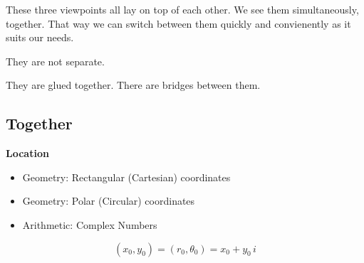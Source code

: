 \documentclass{ximera}
\begin{document}
These three viewpoints all lay on top of each other.  We see them simultaneously, together.  That way we can switch between them quickly and convienently as it suits our needs. 

They are not separate. 

They are glued together.  There are bridges between them.































\qquad




\subsection*{Together}



\textbf{\textcolor{purple!85!blue}{Location}} 


\begin{itemize}
\item Geometry: Rectangular (Cartesian) coordinates
\item Geometry: Polar (Circular) coordinates
\item Arithmetic: Complex Numbers
\end{itemize}



\[
(x_0, y_0) = (r_0, \theta_0) = x_0 + y_0 \, i
\]
\end{document}
